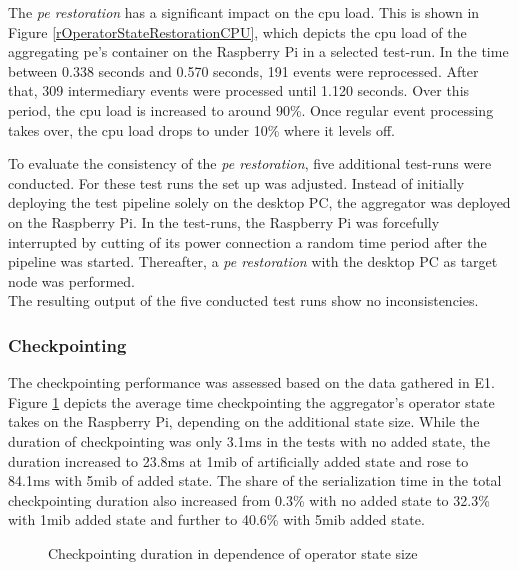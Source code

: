 The \textit{\acrshort{pe} restoration} has a significant impact on the \gls{cpu} load. This is shown in Figure \ref{rOperatorStateRestorationCPU}, which depicts the \gls{cpu} load of the aggregating \gls{pe}'s container on the Raspberry Pi in a selected test-run. In the time between 0.338 seconds and 0.570 seconds, 191 events were reprocessed. After that, 309 intermediary events were processed until 1.120 seconds. Over this period, the \gls{cpu} load is increased to around 90\%. Once regular event processing takes over, the \gls{cpu} load drops to under 10\% where it levels off.\par

To evaluate the consistency of the \textit{\acrshort{pe} restoration}, five additional test-runs were conducted. For these test runs the set up was adjusted. Instead of initially deploying the test pipeline solely on the desktop PC, the aggregator was deployed on the Raspberry Pi. In the test-runs, the Raspberry Pi was forcefully interrupted by cutting of its power connection a random time period after the pipeline was started. Thereafter, a \textit{\acrshort{pe} restoration} with the desktop PC as target node was performed.\\
The resulting output of the five conducted test runs show no inconsistencies.


\subsubsection{Checkpointing}
\label{lResultsCheckpointing}
The checkpointing performance was assessed based on the data gathered in E1. Figure \ref{rCheckpointingDuration} depicts the average time checkpointing the aggregator's operator state takes on the Raspberry Pi, depending on the additional state size. While the duration of checkpointing was only 3.1ms in the tests with no added state, the duration increased to 23.8ms at 1\gls{mib} of artificially added state and rose to 84.1ms with 5\gls{mib} of added state. The share of the serialization time in the total checkpointing duration also increased from 0.3\% with no added state to 32.3\% with 1\gls{mib} added state and further to 40.6\% with 5\gls{mib} added state. 

\begin{figure}[H]
    \centering
    \graphicspath{{./figures/code/}}
    
    \caption{Checkpointing duration in dependence of operator state size}
    \label{rCheckpointingDuration}
\end{figure}


